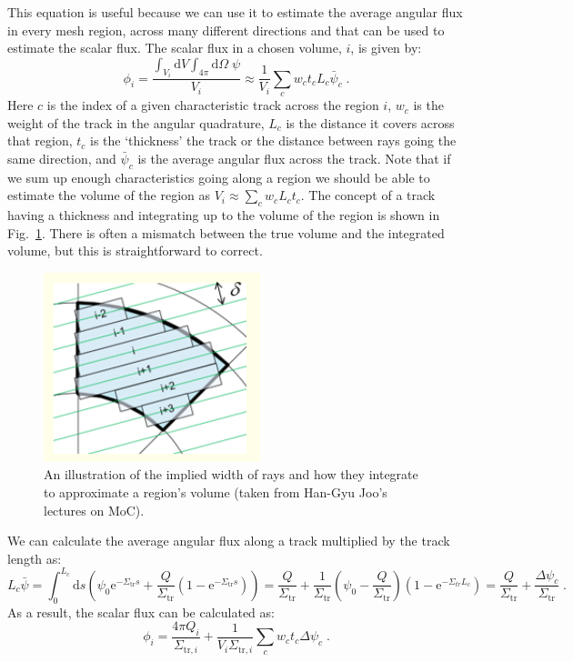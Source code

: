 \documentclass{article}
\begin{document}
This equation is useful because we can use it to estimate the average angular flux in every mesh region, across many different directions and that can be used to estimate the scalar flux. The scalar flux in a chosen volume, $i$, is given by:
\begin{equation}
	\phi_i = \frac{\int_{V_i}\mathrm{d}V\int_{4\pi}\mathrm{d}\Omega\;\psi}{V_i}\approx \frac{1}{V_i}\sum_c w_c t_c L_c \bar{\psi}_c\;\mathrm{.}
\end{equation}
Here $c$ is the index of a given characteristic track across the region $i$, $w_c$ is the weight of the track in the angular quadrature, $L_c$ is the distance it covers across that region, $t_c$ is the `thickness' the track or the distance between rays going the same direction, and $\bar{\psi}_c$ is the average angular flux across the track. Note that if we sum up enough characteristics going along a region we should be able to estimate the volume of the region as $V_i \approx \sum_c w_c L_c t_c$. The concept of a track having a thickness and integrating up to the volume of the region is shown in Fig.~\ref{fig:spacing}. There is often a mismatch between the true volume and the integrated volume, but this is straightforward to correct.

\begin{figure}[h]
    \centering
    \includegraphics[width=0.3\linewidth]{ray_spacing.png}
    \caption{An illustration of the implied width of rays and how they integrate to approximate a region's volume (taken from Han-Gyu Joo's lectures on MoC).}
    \label{fig:spacing}
\end{figure}

We can calculate the average angular flux along a track multiplied by the track length as:
\begin{equation}
    L_c\bar{\psi} = \int^{L_c}_0 \mathrm{d}s\left(\psi_0\mathrm{e}^{-\Sigma_\mathrm{tr}s}+\frac{Q}{\Sigma_\mathrm{tr}}\left(1-\mathrm{e}^{-\Sigma_\mathrm{tr}s}\right)\right) = \frac{Q}{\Sigma_\mathrm{tr}} + \frac{1}{\Sigma_\mathrm{tr}}\left(\psi_0-\frac{Q}{\Sigma_\mathrm{tr}}\right)\left(1-\mathrm{e}^{-\Sigma_{tr}L_c}\right) = \frac{Q}{\Sigma_\mathrm{tr}} + \frac{\Delta\psi_c}{\Sigma_\mathrm{tr}}\;\mathrm{.}
\end{equation}
As a result, the scalar flux can be calculated as:
\begin{equation}\label{eq:MOC_flux}
	\phi_i = \frac{4\pi Q_i} {\Sigma_{\mathrm{tr},i}} + \frac{1}{V_i\Sigma_{\mathrm{tr},i}}\sum_c w_c t_c \Delta\psi_c\;\mathrm{.}
\end{equation}
\end{document}
